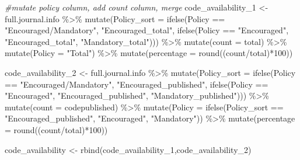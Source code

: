\documentclass[
]{article}
\newenvironment{Shaded}{\begin{snugshade}}{\end{snugshade}}
\newcommand{\AttributeTok}[1]{\textcolor[rgb]{0.77,0.63,0.00}{#1}}
\newcommand{\CommentTok}[1]{\textcolor[rgb]{0.56,0.35,0.01}{\textit{#1}}}
\newcommand{\DecValTok}[1]{\textcolor[rgb]{0.00,0.00,0.81}{#1}}
\newcommand{\FunctionTok}[1]{\textcolor[rgb]{0.00,0.00,0.00}{#1}}
\newcommand{\NormalTok}[1]{#1}
\newcommand{\OtherTok}[1]{\textcolor[rgb]{0.56,0.35,0.01}{#1}}
\newcommand{\SpecialCharTok}[1]{\textcolor[rgb]{0.00,0.00,0.00}{#1}}
\newcommand{\StringTok}[1]{\textcolor[rgb]{0.31,0.60,0.02}{#1}}
\begin{document}
\begin{Shaded}
\begin{Highlighting}[]
\CommentTok{\#mutate policy column, add count column, merge}
\NormalTok{code\_availability\_1 }\OtherTok{\textless{}{-}}\NormalTok{ full.journal.info }\SpecialCharTok{\%\textgreater{}\%} 
  \FunctionTok{mutate}\NormalTok{(}\AttributeTok{Policy\_sort =} \FunctionTok{ifelse}\NormalTok{(Policy }\SpecialCharTok{==} \StringTok{"Encouraged/Mandatory"}\NormalTok{, }\StringTok{"Encouraged\_total"}\NormalTok{, }
                              \FunctionTok{ifelse}\NormalTok{(Policy }\SpecialCharTok{==} \StringTok{"Encouraged"}\NormalTok{, }\StringTok{"Encouraged\_total"}\NormalTok{, }\StringTok{"Mandatory\_total"}\NormalTok{))) }\SpecialCharTok{\%\textgreater{}\%} 
  \FunctionTok{mutate}\NormalTok{(}\AttributeTok{count =}\NormalTok{ total) }\SpecialCharTok{\%\textgreater{}\%} 
  \FunctionTok{mutate}\NormalTok{(}\AttributeTok{Policy =} \StringTok{"Total"}\NormalTok{) }\SpecialCharTok{\%\textgreater{}\%} 
  \FunctionTok{mutate}\NormalTok{(}\AttributeTok{percentage =} \FunctionTok{round}\NormalTok{((count}\SpecialCharTok{/}\NormalTok{total)}\SpecialCharTok{*}\DecValTok{100}\NormalTok{))}

\NormalTok{code\_availability\_2 }\OtherTok{\textless{}{-}}\NormalTok{ full.journal.info }\SpecialCharTok{\%\textgreater{}\%} 
  \FunctionTok{mutate}\NormalTok{(}\AttributeTok{Policy\_sort =} \FunctionTok{ifelse}\NormalTok{(Policy }\SpecialCharTok{==} \StringTok{"Encouraged/Mandatory"}\NormalTok{, }\StringTok{"Encouraged\_published"}\NormalTok{, }
                         \FunctionTok{ifelse}\NormalTok{(Policy }\SpecialCharTok{==} \StringTok{"Encouraged"}\NormalTok{, }\StringTok{"Encouraged\_published"}\NormalTok{, }\StringTok{"Mandatory\_published"}\NormalTok{))) }\SpecialCharTok{\%\textgreater{}\%} 
  \FunctionTok{mutate}\NormalTok{(}\AttributeTok{count =}\NormalTok{ codepublished) }\SpecialCharTok{\%\textgreater{}\%} 
  \FunctionTok{mutate}\NormalTok{(}\AttributeTok{Policy =} \FunctionTok{ifelse}\NormalTok{(Policy\_sort }\SpecialCharTok{==} \StringTok{"Encouraged\_published"}\NormalTok{, }\StringTok{"Encouraged"}\NormalTok{, }\StringTok{"Mandatory"}\NormalTok{)) }\SpecialCharTok{\%\textgreater{}\%} 
  \FunctionTok{mutate}\NormalTok{(}\AttributeTok{percentage =} \FunctionTok{round}\NormalTok{((count}\SpecialCharTok{/}\NormalTok{total)}\SpecialCharTok{*}\DecValTok{100}\NormalTok{))}

\NormalTok{code\_availability }\OtherTok{\textless{}{-}} \FunctionTok{rbind}\NormalTok{(code\_availability\_1,code\_availability\_2)}
\end{Highlighting}
\end{Shaded}
\end{document}
